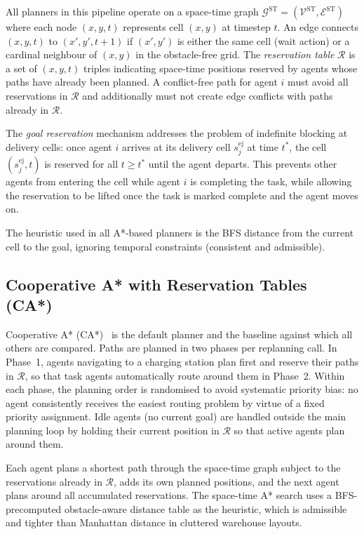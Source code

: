 All planners in this pipeline operate on a space-time graph
$\mathcal{G}^{\text{ST}} = (\mathcal{V}^{\text{ST}}, \mathcal{E}^{\text{ST}})$
where each node $(x, y, t)$ represents cell $(x, y)$ at timestep $t$.
An edge connects $(x, y, t)$ to $(x', y', t+1)$ if $(x', y')$ is either the
same cell (wait action) or a cardinal neighbour of $(x, y)$ in the
obstacle-free grid.
The \emph{reservation table} $\mathcal{R}$ is a set of
$(x, y, t)$ triples indicating space-time positions reserved by agents whose
paths have already been planned.
A conflict-free path for agent $i$ must avoid all reservations in
$\mathcal{R}$ and additionally must not create edge conflicts with paths already
in $\mathcal{R}$.

The \emph{goal reservation} mechanism addresses the problem of indefinite
blocking at delivery cells: once agent $i$ arrives at its delivery cell
$s_j^{\text{ej}}$ at time $t^*$, the cell $(s_j^{\text{ej}}, t)$ is reserved
for all $t \geq t^*$ until the agent departs.
This prevents other agents from entering the cell while agent $i$ is completing
the task, while allowing the reservation to be lifted once the task is marked
complete and the agent moves on.

The heuristic used in all A*-based planners is the BFS distance from the
current cell to the goal, ignoring temporal constraints (consistent and
admissible).


\subsection{Cooperative A* with Reservation Tables (CA*)}
\label{subsec:method_castar}

Cooperative A* (CA*)~\cite{silver2005cooperative} is the default planner and
the baseline against which all others are compared.
Paths are planned in two phases per replanning call.
In Phase~1, agents navigating to a charging station plan first and reserve their
paths in $\mathcal{R}$, so that task agents automatically route around them in
Phase~2.
Within each phase, the planning order is randomised to avoid systematic priority
bias: no agent consistently receives the easiest routing problem by virtue of a
fixed priority assignment.
Idle agents (no current goal) are handled outside the main planning loop by
holding their current position in $\mathcal{R}$ so that active agents plan
around them.

Each agent plans a shortest path through the space-time graph subject to the
reservations already in $\mathcal{R}$, adds its own planned positions, and the
next agent plans around all accumulated reservations.
The space-time A* search uses a BFS-precomputed obstacle-aware distance table
as the heuristic, which is admissible and tighter than Manhattan distance in
cluttered warehouse layouts.

